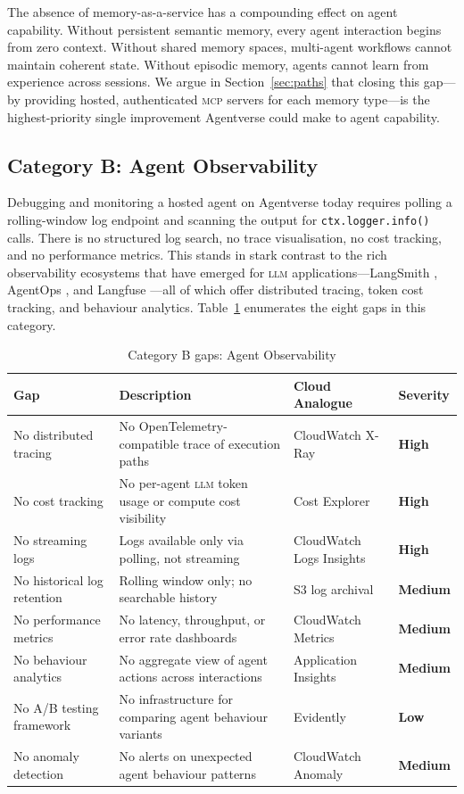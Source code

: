 \documentclass[twoside,11pt]{article}
\newcommand{\high}{\textcolor{red!70!black}{\textbf{High}}}
\newcommand{\medium}{\textcolor{orange!80!black}{\textbf{Medium}}}
\newcommand{\low}{\textcolor{green!50!black}{\textbf{Low}}}
\begin{document}
The absence of memory-as-a-service has a compounding effect on agent
capability.  Without persistent semantic memory, every agent interaction begins
from zero context.  Without shared memory spaces, multi-agent workflows cannot
maintain coherent state.  Without episodic memory, agents cannot learn from
experience across sessions.  We argue in Section~\ref{sec:paths} that closing
this gap---by providing hosted, authenticated \textsc{mcp} servers for each
memory type---is the highest-priority single improvement Agentverse could make
to agent capability.

\subsection{Category B: Agent Observability}
\label{subsec:gap-obs}

Debugging and monitoring a hosted agent on Agentverse today requires
polling a rolling-window log endpoint and scanning the
output for \texttt{ctx.logger.info()} calls.  There is no structured log
search, no trace visualisation, no cost tracking, and no performance metrics.
This stands in stark contrast to the rich observability ecosystems that have
emerged for \textsc{llm} applications---LangSmith \citep{langsmith2026},
AgentOps \citep{agentops2026}, and Langfuse \citep{langfuse2026}---all of
which offer distributed tracing, token cost tracking, and behaviour analytics.
Table~\ref{tab:gap-obs} enumerates the eight gaps in this category.

\begin{table}[htbp]
\centering
\caption{Category B gaps: Agent Observability}
\label{tab:gap-obs}
\begin{tabular}{>{\raggedright\arraybackslash}p{3.2cm} >{\raggedright\arraybackslash}p{5.5cm} >{\raggedright\arraybackslash}p{2.9cm} l}
\toprule
\textbf{Gap} & \textbf{Description} & \textbf{Cloud Analogue} &
\textbf{Severity} \\
\midrule
No distributed tracing & No OpenTelemetry-compatible trace of execution paths &
CloudWatch X-Ray & \high \\
No cost tracking & No per-agent \textsc{llm} token usage or compute cost
visibility & Cost Explorer & \high \\
No streaming logs & Logs available only via polling, not streaming & CloudWatch
Logs Insights & \high \\
No historical log retention & Rolling window only; no searchable history & S3
log archival & \medium \\
No performance metrics & No latency, throughput, or error rate dashboards &
CloudWatch Metrics & \medium \\
No behaviour analytics & No aggregate view of agent actions across interactions
& Application Insights & \medium \\
No A/B testing framework & No infrastructure for comparing agent behaviour
variants & Evidently & \low \\
No anomaly detection & No alerts on unexpected agent behaviour patterns &
CloudWatch Anomaly & \medium \\
\bottomrule
\end{tabular}
\end{table}
\end{document}
